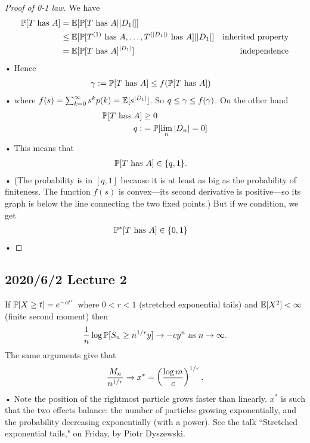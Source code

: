 \begin{proof}[Proof of 0-1 law]
We have
\begin{align*}
\mathbb{P}[T\text{ has }A] &= \mathbb{E}[\mathbb{P}[T\text{ has }A||D_1|]]\\
&\le \mathbb{E}[\mathbb{P}[T^{(1)}\text{ has }A,\ldots, T^{(|D_1|)}\text{ has }A]||D_1|]
&\text{inherited property}\\
&= \mathbb{E}[\mathbb{P}[T\text{ has }A]^{|D_1|}]&\text{independence}
\end{align*}•
Hence 
\begin{align*}
\gamma :=\mathbb{P}[T\text{ has }A] &\le f(\mathbb{P}[T\text{ has }A])
\end{align*}•
where $f(s) =\sum_{k=0}^{\infty} s^kp(k)= \mathbb{E}[s^{|D_1|}]$. 
So $q\le \gamma \le f(\gamma)$.
On the other  hand
\begin{align*}
\mathbb{P}[T\text{ has }A] &\ge 0\\
q:&= \mathbb{P}[\lim_{n} |D_n|=0]
\end{align*}•
This means that 
\begin{align*}
\mathbb{P}[T\text{ has }A] &\in \{q,1\}.
\end{align*}•
(The probability is in $[q,1]$ because it is at least as big as the probability of finiteness. The function $f(s)$ is convex---its second derivative is positive---so its graph is below the line connecting the two fixed points.)
But if we condition, we get
\begin{align*}
\mathbb{P}^*[T\text{ has }A]&\in \{0,1\}
\end{align*}•
\end{proof}

\subsection*{2020/6/2 Lecture 2}

\begin{rem}
If $\mathbb{P}[X\ge t] = e^{-ct^r}$ where $0<r<1$ (stretched exponential tails) and $\mathbb{E}[X^2]<\infty$ (finite second moment) then $$\frac{1}{n}\log \mathbb{P}[S_n\ge n^{1/r} y]\to -cy^n\text{ as }n\to \infty.$$
The same arguments give that 
\begin{align*}
\frac{M_n}{n^{1/r}} \to x^* = \left( {\frac{\log m}{c}} \right)^{1/r}.
\end{align*}•
Note the position of the rightmost particle grows faster than linearly. $x^*$ is such that the two effects balance: the number of particles growing exponentially, and the probability decreasing exponentially (with a power).
See the talk ``Stretched exponential tails," on Friday, by Piotr Dyszewski.
\end{rem}

